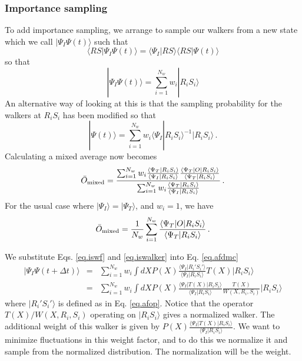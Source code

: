 \subsubsection{Importance sampling}
To add importance sampling, we arrange to sample our walkers from
a new state which we call $|\Psi_I \Psi(t)\rangle$ such that
\begin{equation}
\label{eq.iswf}
\langle R S |\Psi_I\Psi(t)\rangle
= \langle \Psi_I|RS\rangle \langle RS|\Psi(t)\rangle
\end{equation}
so that
\begin{equation}
\label{eq.iswalker}
|\Psi_I \Psi(t)\rangle = \sum_{i=1}^{N_w} w_i |R_iS_i\rangle
\end{equation}
An alternative way of looking at this is that
the sampling probability for the walkers at $R_iS_i$ has been
modified so that
\begin{equation}
\label{eq.imp}
|\Psi(t)\rangle = \sum_{i=1}^{N_w} w_i \langle \Psi_I|R_iS_i\rangle^{-1}
|R_i S_i\rangle \,.
\end{equation}
Calculating a mixed average now becomes
\begin{equation}
\bar O_{\rm mixed} = \frac{\sum_{i=1}^{N_w} w_i
\frac{\langle \Psi_T|R_iS_i\rangle}{\langle \Psi_I|R_iS_i\rangle}
\frac{\langle \Psi_T|O|R_iS_i\rangle}{\langle \Psi_T|R_iS_i\rangle}}
{\sum_{i=1}^{N_w} w_i
\frac{\langle \Psi_T|R_iS_i\rangle}{\langle \Psi_I|R_iS_i\rangle}
} \,.
\end{equation}
For the usual case where $|\Psi_I\rangle = |\Psi_T\rangle$, and
$w_i = 1$, we have
\begin{equation}
\bar O_{\rm mixed} = \frac{1}{N_w} \sum_{i=1}^{N_w}
\frac{\langle \Psi_T|O|R_iS_i\rangle}{\langle \Psi_T|R_iS_i\rangle} \,.
\end{equation}


We substitute Eqs. \ref{eq.iswf} and \ref{eq.iswalker} into Eq. \ref{eq.afdmc}
\begin{eqnarray}
|\Psi_I \Psi(t+\Delta t)\rangle &=& \sum_{i=1}^{N_w} w_i
\int dX P(X)
\frac{\langle \Psi_I|R_i'S_i'\rangle}{\langle \Psi_I|R_iS_i\rangle}
T(X)|R_i S_i\rangle
\nonumber\\
&=&
\sum_{i=1}^{N_w} w_i
\int dX P(X)
\frac{\langle \Psi_I|T(X)|R_iS_i\rangle}{\langle \Psi_I|R_iS_i\rangle}
\frac{T(X)}{W(X,R_i,S_i)}|R_i S_i\rangle
\end{eqnarray}
where $|R_i'S_i'\rangle$ is defined as in Eq. \ref{eq.afop}.
Notice that the operator $T(X)/W(X,R_i,S_i)$ operating on $|R_iS_i\rangle$
gives a normalized walker. The additional weight of this walker is given by
$P(X)\frac{\langle \Psi_I|T(X)|R_iS_i\rangle}{\langle \Psi_I|R_iS_i\rangle}$.
We want to minimize fluctuations in this weight factor, and to do this
we normalize it and sample from the normalized distribution. The
normalization will be the weight.

